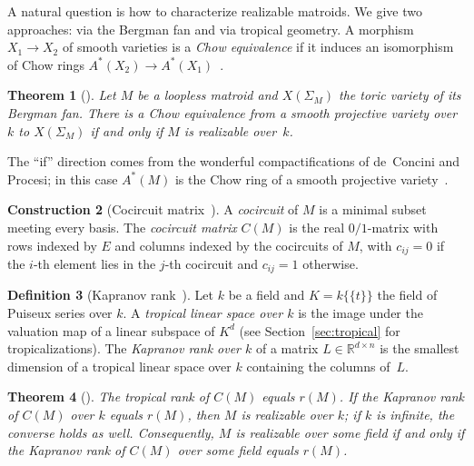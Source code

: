 \documentclass[11pt,a4paper]{article}
\numberwithin{equation}{section}
\theoremstyle{plain}
\newtheorem{theorem}{Theorem}[section]
\theoremstyle{definition}
\newtheorem{definition}[theorem]{Definition}
\newtheorem{construction}[theorem]{Construction}
\theoremstyle{remark}
\newcommand{\R}{\mathbb{R}}
\begin{document}
A natural question is how to characterize realizable matroids. We give two approaches: via the Bergman fan and via tropical geometry. A morphism $X_1\to X_2$ of smooth varieties is a \emph{Chow equivalence} if it induces an isomorphism of Chow rings $A^*(X_2)\to A^*(X_1)$~\cite[Def.~5.11]{AHK18}.

\begin{theorem}[{\cite[Thm.~5.12]{AHK18}}]\label{thm:AHK}
Let $M$ be a loopless matroid and $X(\Sigma_M)$ the toric variety of its Bergman fan. There is a Chow equivalence from a smooth projective variety over $k$ to $X(\Sigma_M)$ if and only if $M$ is realizable over~$k$.
\end{theorem}

The ``if'' direction comes from the wonderful compactifications of de~Concini and Procesi; in this case $A^*(M)$ is the Chow ring of a smooth projective variety~\cite{FY04,AHK18}.

\begin{construction}[Cocircuit matrix~{\cite[Def.~7.1]{DSS05}}]
A \emph{cocircuit} of $M$ is a minimal subset meeting every basis. The \emph{cocircuit matrix} $C(M)$ is the real $0/1$-matrix with rows indexed by $E$ and columns indexed by the cocircuits of $M$, with $c_{ij}=0$ if the $i$-th element lies in the $j$-th cocircuit and $c_{ij}=1$ otherwise.
\end{construction}

\begin{definition}[Kapranov rank~{\cite[Def.~3.9]{DSS05}}]
Let $k$ be a field and $K=k\{\{t\}\}$ the field of Puiseux series over $k$. A \emph{tropical linear space over $k$} is the image under the valuation map of a linear subspace of $K^d$ (see Section~\ref{sec:tropical} for tropicalizations). The \emph{Kapranov rank over $k$} of a matrix $L\in\R^{d\times n}$ is the smallest dimension of a tropical linear space over $k$ containing the columns of~$L$.
\end{definition}

\begin{theorem}[{\cite[Prop.~7.2, Thm.~7.3]{DSS05}}]\label{thm:DSS}
The tropical rank of $C(M)$ equals $r(M)$. If the Kapranov rank of $C(M)$ over $k$ equals $r(M)$, then $M$ is realizable over $k$; if $k$ is infinite, the converse holds as well. Consequently, $M$ is realizable over some field if and only if the Kapranov rank of $C(M)$ over some field equals $r(M)$.
\end{theorem}

\end{document}

